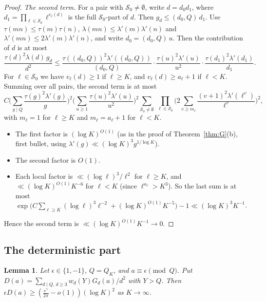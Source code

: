 \documentclass[11pt]{amsart}
\newtheorem{lemma}{Lemma}[section]
\theoremstyle{remark}
\begin{document}
\begin{proof}
\emph{The second term.} For a pair with $\mathcal S_0\ne\emptyset$, write $d=d_0d_1$, where $d_1=\prod_{\ell\in\mathcal S_0}\ell^{v_\ell(d)}$ is the full $\mathcal S_0$-part of $d$. Then $g_d\le(d_0,Q)\,d_1$. Use $\tau(mn)\le\tau(m)\tau(n)$, $\lambda(mn)\le\lambda'(m)\lambda'(n)$ and $\lambda'(mn)\le2\lambda'(m)\lambda'(n)$, and write $d_0=(d_0,Q)\,u$. Then the contribution of $d$ is at most
\[
\frac{\tau(d)^2\lambda(d)\,g_d}{d^2}\le\frac{\tau((d_0,Q))^2\lambda'((d_0,Q))}{(d_0,Q)}\cdot\frac{\tau(u)^2\lambda'(u)}{u^2}\cdot\frac{\tau(d_1)^2\lambda'(d_1)}{d_1}.
\]
For $\ell\in\mathcal S_0$ we have $v_\ell(d)\ge1$ if $\ell\ge K$, and $v_\ell(d)\ge a_\ell+1$ if $\ell<K$. Summing over all pairs, the second term is at most
\[
C\Big(\sum_{g\mid Q}\frac{\tau(g)^2\lambda'(g)}g\Big)^2\Big(\sum_{u\ge1}\frac{\tau(u)^2\lambda'(u)}{u^2}\Big)^2\sum_{\mathcal S_0\neq\emptyset}\ \prod_{\ell\in\mathcal S_0}\Big(2\sum_{v\ge m_\ell}\frac{(v+1)^2\lambda'(\ell^v)}{\ell^v}\Big)^2,
\]
with $m_\ell=1$ for $\ell\ge K$ and $m_\ell=a_\ell+1$ for $\ell<K$.
\begin{itemize}
\item The first factor is $(\log K)^{O(1)}$ (as in the proof of Theorem~\ref{thm:G}(b), first bullet, using $\lambda'(g)\ll(\log K)^3g^{1/\log K}$).
\item The second factor is $O(1)$.
\item Each local factor is $\ll(\log\ell)^3/\ell^2$ for $\ell\ge K$, and $\ll(\log K)^{O(1)}K^{-6}$ for $\ell<K$ (since $\ell^{a_\ell}>K^3$). So the last sum is at most $\exp\big(C\sum_{\ell\ge K}(\log\ell)^3\ell^{-2}+(\log K)^{O(1)}K^{-5}\big)-1\ll(\log K)^3K^{-1}$.
\end{itemize}
Hence the second term is $\ll(\log K)^{O(1)}K^{-1}\to0$.
\end{proof}

\subsection{The deterministic part}

\begin{lemma}\label{lem:det}
Let $\epsilon\in\{1,-1\}$, $Q=Q_K$, and $a\equiv\epsilon\pmod Q$. Put $D(a)=\sum_{d\mid Q,\,d\ge3}w_d(Y)G_d(a)/d^2$ with $Y>Q$. Then $\epsilon D(a)\ge(\frac{e^\gamma}{2\pi}-o(1))(\log K)^2$ as $K\to\infty$.
\end{lemma}
\end{document}
